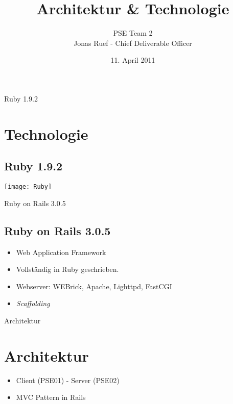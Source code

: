 \documentclass{beamer}
\title{Architektur \& Technologie}
\author{PSE Team 2\\Jonas Ruef - Chief Deliverable Officer}
\date{11. April  2011}
\begin{document}
\maketitle
{}
\begin{frame}{Ruby 1.9.2}
\section{Technologie}
\subsection{Ruby 1.9.2}
\bigbreak
\noindent\texttt{[image: Ruby]}
\end{frame}
\begin{frame}{Ruby on Rails 3.0.5}
\subsection{Ruby on Rails 3.0.5}
\begin{itemize}
 \item Web Application Framework
 \item Vollständig in Ruby geschrieben.
 \item Webserver: WEBrick, Apache, Lighttpd, FastCGI
 \item \textit{Scaffolding}
\end{itemize}
\end{frame}
\begin{frame}{Architektur}
\section{Architektur}
\begin{itemize}
 \item Client (PSE01) - Server (PSE02)
 \item MVC Pattern in Rails
\end{itemize}
\end{frame}
\end{document}
